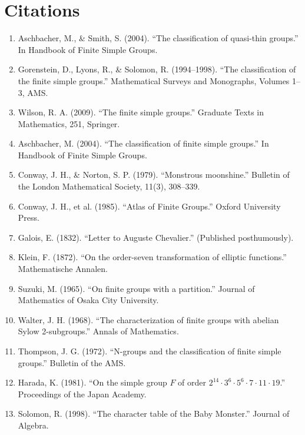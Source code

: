 \section{Citations}

\begin{enumerate}
\item Aschbacher, M., \& Smith, S. (2004). ``The classification of quasi-thin groups.'' In Handbook of Finite Simple Groups.
\item Gorenstein, D., Lyons, R., \& Solomon, R. (1994--1998). ``The classification of the finite simple groups.'' Mathematical Surveys and Monographs, Volumes 1--3, AMS.
\item Wilson, R. A. (2009). ``The finite simple groups.'' Graduate Texts in Mathematics, 251, Springer.
\item Aschbacher, M. (2004). ``The classification of finite simple groups.'' In Handbook of Finite Simple Groups.
\item Conway, J. H., \& Norton, S. P. (1979). ``Monstrous moonshine.'' Bulletin of the London Mathematical Society, 11(3), 308--339.
\item Conway, J. H., et al. (1985). ``Atlas of Finite Groups.'' Oxford University Press.
\item Galois, E. (1832). ``Letter to Auguste Chevalier.'' (Published posthumously).
\item Klein, F. (1872). ``On the order-seven transformation of elliptic functions.'' Mathematische Annalen.
\item Suzuki, M. (1965). ``On finite groups with a partition.'' Journal of Mathematics of Osaka City University.
\item Walter, J. H. (1968). ``The characterization of finite groups with abelian Sylow 2-subgroups.'' Annals of Mathematics.
\item Thompson, J. G. (1972). ``N-groups and the classification of finite simple groups.'' Bulletin of the AMS.
\item Harada, K. (1981). ``On the simple group $F$ of order $2^{14} \cdot 3^6 \cdot 5^6 \cdot 7 \cdot 11 \cdot 19$.'' Proceedings of the Japan Academy.
\item Solomon, R. (1998). ``The character table of the Baby Monster.'' Journal of Algebra.
\end{enumerate}
